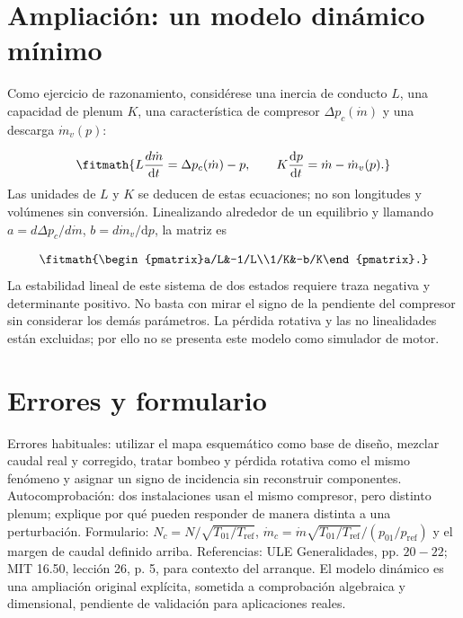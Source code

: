 \documentclass[10pt,openany]{book}
\begin{document}
\par\vspace{\baselineskip}

\section{Ampliación: un modelo dinámico mínimo}

Como ejercicio de razonamiento, considérese una inercia de conducto \(L\), una capacidad de plenum \(K\), una característica de compresor \(\Delta p_c(\dot m)\) y una descarga \(\dot m_v(p)\):

\[
\fitmath{L\frac{d\dot m}{\mathrm{d}t}=\Delta p_c(\dot m)-p,\qquad
K\frac{\mathrm{d}p}{\mathrm{d}t}=\dot m-\dot m_v(p).}
\]
Las unidades de \(L\) y \(K\) se deducen de estas ecuaciones; no son longitudes y volúmenes sin conversión. Linealizando alrededor de un equilibrio y llamando \(a=d\Delta p_c/d\dot m\), \(b=d\dot m_v/\mathrm{d}p\), la matriz es

\[
\fitmath{\begin{pmatrix}a/L&-1/L\\1/K&-b/K\end{pmatrix}.}
\]
La estabilidad lineal de este sistema de dos estados requiere traza negativa y determinante positivo. No basta con mirar el signo de la pendiente del compresor sin considerar los demás parámetros. La pérdida rotativa y las no linealidades están excluidas; por ello no se presenta este modelo como simulador de motor.

\section{Errores y formulario}

Errores habituales: utilizar el mapa esquemático como base de diseño, mezclar caudal real y corregido, tratar bombeo y pérdida rotativa como el mismo fenómeno y asignar un signo de incidencia sin reconstruir componentes. Autocomprobación: dos instalaciones usan el mismo compresor, pero distinto plenum; explique por qué pueden responder de manera distinta a una perturbación.
Formulario: \(N_c=N/\sqrt{T_{01}/T_{\mathrm{ref}}}\), \(\dot m_c=\dot m\sqrt{T_{01}/T_{\mathrm{ref}}}/(p_{01}/p_{\mathrm{ref}})\) y el margen de caudal definido arriba. Referencias: ULE Generalidades, pp. \(20-22\); MIT 16.50, lección 26, p. 5, para contexto del arranque. El modelo dinámico es una ampliación original explícita, sometida a comprobación algebraica y dimensional, pendiente de validación para aplicaciones reales.
\end{document}
